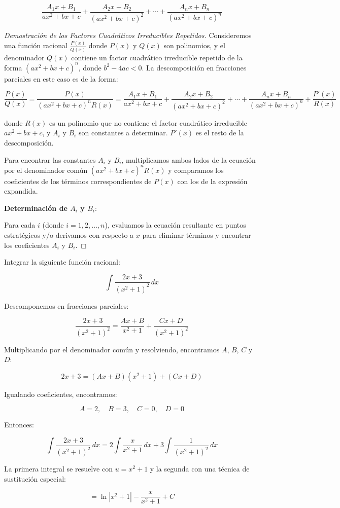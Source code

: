 \[
\frac{A_1x + B_1}{ax^2 + bx + c} + \frac{A_2x + B_2}{(ax^2 + bx + c)^2} + \cdots + \frac{A_nx + B_n}{(ax^2 + bx + c)^n}
\]
\begin{proof}[Demostración de los Factores Cuadráticos Irreducibles Repetidos]
    Consideremos una función racional \( \frac{P(x)}{Q(x)} \) donde \( P(x) \) y \( Q(x) \) son polinomios, y el denominador \( Q(x) \) contiene un factor cuadrático irreducible repetido de la forma \( (ax^2 + bx + c)^n \), donde \( b^2 - 4ac < 0 \). La descomposición en fracciones parciales en este caso es de la forma:

    \[
    \frac{P(x)}{Q(x)} = \frac{P(x)}{(ax^2 + bx + c)^n R(x)} = \frac{A_1x + B_1}{ax^2 + bx + c} + \frac{A_2x + B_2}{(ax^2 + bx + c)^2} + \cdots + \frac{A_nx + B_n}{(ax^2 + bx + c)^n} + \frac{P'(x)}{R(x)}
    \]
    
    donde \( R(x) \) es un polinomio que no contiene el factor cuadrático irreducible \( ax^2 + bx + c \), y \( A_i \) y \( B_i \) son constantes a determinar. \( P'(x) \) es el resto de la descomposición.
    
    Para encontrar las constantes \( A_i \) y \( B_i \), multiplicamos ambos lados de la ecuación por el denominador común \( (ax^2 + bx + c)^n R(x) \) y comparamos los coeficientes de los términos correspondientes de \( P(x) \) con los de la expresión expandida.
    
    \textbf{Determinación de \( A_i \) y \( B_i \)}:
    
    Para cada \( i \) (donde \( i = 1, 2, \ldots, n \)), evaluamos la ecuación resultante en puntos estratégicos y/o derivamos con respecto a \( x \) para eliminar términos y encontrar los coeficientes \( A_i \) y \( B_i \).
    
\end{proof}
\begin{example}
    Integrar la siguiente función racional:

\[
\int \frac{2x + 3}{(x^2 + 1)^2} \, dx
\]

Descomponemos en fracciones parciales:

\[
\frac{2x + 3}{(x^2 + 1)^2} = \frac{Ax + B}{x^2 + 1} + \frac{Cx + D}{(x^2 + 1)^2}
\]

Multiplicando por el denominador común y resolviendo, encontramos \( A \), \( B \), \( C \) y \( D \):

\[
2x + 3 = (Ax + B)(x^2 + 1) + (Cx + D)
\]

Igualando coeficientes, encontramos:

\[
A = 2, \quad B = 3, \quad C = 0, \quad D = 0
\]

Entonces:

\[
\int \frac{2x + 3}{(x^2 + 1)^2} \, dx = 2 \int \frac{x}{x^2 + 1} \, dx + 3 \int \frac{1}{(x^2 + 1)^2} \, dx
\]

La primera integral se resuelve con \( u = x^2 + 1 \) y la segunda con una técnica de sustitución especial:

\[
= \ln |x^2 + 1| - \frac{x}{x^2 + 1} + C
\]

\end{example}




